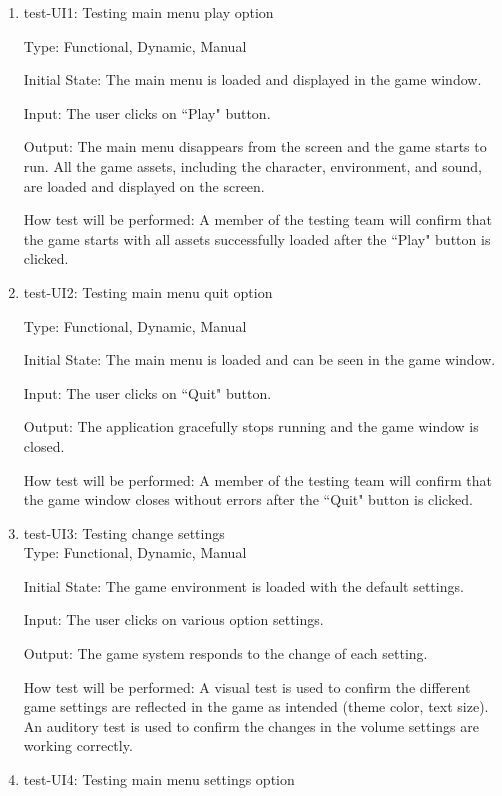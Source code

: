 \documentclass[12pt, titlepage]{article}
\begin{document}
\begin{enumerate}

\item{test-UI1: Testing main menu play option\\}

Type: Functional, Dynamic, Manual
					
Initial State: The main menu is loaded and displayed in the game window.
					
Input: The user clicks on ``Play" button.
					
Output: The main menu disappears from the screen and the game starts to run. All the game assets, including the character, environment, and sound, are loaded and displayed on the screen.
					
How test will be performed: A member of the testing team will confirm that the game starts with all assets successfully loaded after the ``Play" button is clicked. 

\item{test-UI2: Testing main menu quit option\\}

Type: Functional, Dynamic, Manual
					
Initial State: The main menu is loaded and can be seen in the game window.
					
Input: The user clicks on ``Quit" button.
					
Output: The application gracefully stops running and the game window is closed.
					
How test will be performed: A member of the testing team will confirm that the game window closes without errors after the ``Quit" button is clicked. 

\item{test-UI3: Testing change settings\\}
Type: Functional, Dynamic, Manual
					
Initial State: The game environment is loaded with the default settings.
					
Input: The user clicks on various option settings.
					
Output: The game system responds to the change of each setting.
					
How test will be performed: A visual test is used to confirm the different game settings are reflected in the game as intended (theme color, text size). An auditory test is used to confirm the changes in the volume settings are working correctly. 

\item{test-UI4: Testing main menu settings option\\}


\end{enumerate}
\end{document}
